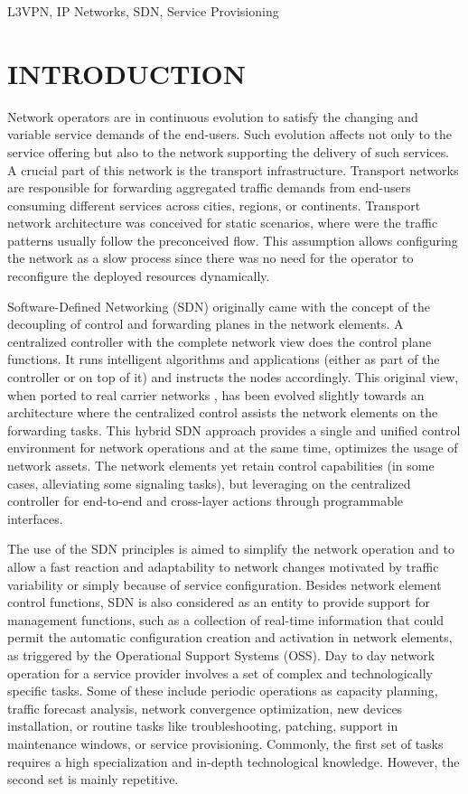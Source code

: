 \documentclass[conference]{IEEEtran}
\begin{document}
\begin{IEEEkeywords}
L3VPN, IP Networks, SDN, Service Provisioning
\end{IEEEkeywords}

\section{INTRODUCTION}
Network operators are in continuous evolution to satisfy the changing and variable service demands of the end-users. Such evolution affects not only to the service offering but also to the network supporting the delivery of such services. A crucial part of this network is the transport infrastructure. Transport networks are responsible for forwarding aggregated traffic demands from end-users consuming different services across cities, regions, or continents. Transport network architecture was conceived for static scenarios, where were the traffic patterns usually follow the preconceived flow. This assumption allows configuring the network as a slow process since there was no need for the operator to reconfigure the deployed resources dynamically.

Software-Defined Networking (SDN) originally \cite{brief2014openflow,gude2008nox,tavakoli2009applying} came with the concept of the decoupling of control and forwarding planes in the network elements. A centralized controller with the complete network view does the control plane functions. It runs intelligent algorithms and applications (either as part of the controller or on top of it) and instructs the nodes accordingly. This original view, when ported to real carrier networks \cite{bemby2015vino}, has been evolved slightly towards an architecture where the centralized control assists the network elements on the forwarding tasks. This hybrid SDN approach provides a single and unified control environment for network operations and at the same time, optimizes the usage of network assets. The network elements yet retain control capabilities (in some cases, alleviating some signaling tasks), but leveraging on the centralized controller for end-to-end and cross-layer actions through programmable interfaces. 

The use of the SDN principles is aimed to simplify the network operation and to allow a fast reaction and adaptability to network changes motivated by traffic variability or simply because of service configuration. Besides network element control functions, SDN is also considered as an entity to provide support for management functions, such as a collection of real-time information that could permit the automatic configuration creation and activation in network elements, as triggered by the Operational Support Systems (OSS). Day to day network operation for a service provider involves a set of complex and technologically specific tasks. Some of these include periodic operations as capacity planning, traffic forecast analysis, network convergence optimization, new devices installation, or routine tasks like troubleshooting, patching, support in maintenance windows, or service provisioning. Commonly, the first set of tasks requires a high specialization and in-depth technological knowledge. However, the second set is mainly repetitive. 
\end{document}
